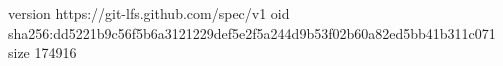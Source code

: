 version https://git-lfs.github.com/spec/v1
oid sha256:dd5221b9c56f5b6a3121229def5e2f5a244d9b53f02b60a82ed5bb41b311c071
size 174916
